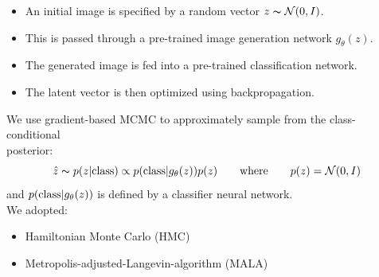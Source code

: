 \documentclass[landscape,a0b,final,a4resizeable]{include/a0poster}
\begin{document}
\begin{poster}
\begin{multicols}{3}
\begin{itemize}
\item An initial image is specified by a random vector $z \thicksim \mathcal{N}(0, I)$.
 \item This is passed through a pre-trained image generation network $g_\theta(z)$.
\item The generated image is fed into a pre-trained classification network.
 \item The latent vector is then optimized using backpropagation.
\end{itemize}
\vspace{1cm}
We use gradient-based MCMC to approximately sample from the class-conditional \\posterior:\\
\begin{equation*}
    \hat z \thicksim p(z|\textnormal{class}) \propto p(\textnormal{class} | g_\theta(z)) p(z) \qquad \textnormal{where} \qquad p(z) = \mathcal{N}(0, I)
\end{equation*}
\linebreak
and $p(\textnormal{class} | g_\theta(z))$ is defined by a classifier neural network.\\

We adopted:
\begin{itemize}
\item Hamiltonian Monte Carlo (HMC) 
\item Metropolis-adjusted-Langevin-algorithm (MALA) 
\end{itemize}
 


\end{multicols}
\end{poster}
\end{document}
